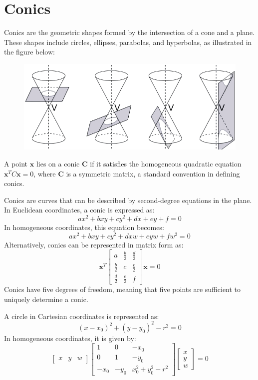 \section{Conics}

Conics are the geometric shapes formed by the intersection of a cone and a plane. 
These shapes include circles, ellipses, parabolas, and hyperbolas, as illustrated in the figure below:
\begin{figure}[H]
    \centering
    \includegraphics[width=0.5\linewidth]{images/conics.png}
\end{figure}
\begin{definition}
    A point $\mathbf{x}$  lies on a conic $\mathbf{C}$ if it satisfies the homogeneous quadratic equation $\mathbf{x}^TC\mathbf{x}=0$, where $\mathbf{C}$ is a symmetric matrix, a standard convention in defining conics.
\end{definition}
Conics are curves that can be described by second-degree equations in the plane. 
In Euclidean coordinates, a conic is expressed as:
\[ax^2+bxy+cy^2+dx+ey+f=0\]
In homogeneous coordinates, this equation becomes:
\[ax^2+bxy+cy^2+dxw+eyw+fw^2=0\]
Alternatively, conics can be represented in matrix form as:
\[\mathbf{x}^T \begin{bmatrix} a & \frac{b}{2} & \frac{d}{2} \\ \frac{b}{2} & c & \frac{e}{2} \\ \frac{d}{2} & \frac{e}{2} & f \end{bmatrix} \mathbf{x}=0\]
Conics have five degrees of freedom, meaning that five points are sufficient to uniquely determine a conic.
\begin{example}
    A circle in Cartesian coordinates is represented as:
    \[(x-x_0)^2+(y-y_0)^2-r^2=0\]
    In homogeneous coordinates, it is given by:
    \[\begin{bmatrix} x & y & w \end{bmatrix} \begin{bmatrix} 1 & 0 & -x_0 \\ 0 & 1 & -y_0 \\ -x_0 & -y_0 & x_0^2+y_0^2-r^2 \end{bmatrix} \begin{bmatrix} x \\ y \\ w \end{bmatrix} = 0\]
\end{example}

